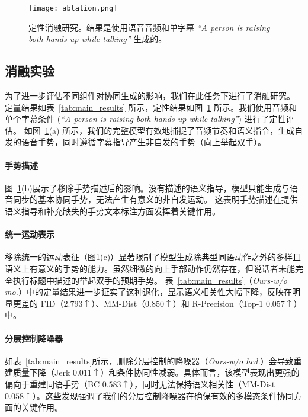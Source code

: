 \begin{figure}[t]
    \centering
    \texttt{[image: ablation.png]}
    \caption{定性消融研究。结果是使用语音音频和单字幕 \textit{``A person is raising both hands up while talking''} 生成的。}
    \label{fig:ablation}
\end{figure}

\subsection{消融实验}
\label{sec:exp_ablation}
为了进一步评估不同组件对协同生成的影响，我们在此任务下进行了消融研究。
定量结果如表~\ref{tab:main_results} 所示，定性结果如图~\ref{fig:ablation} 所示。我们使用音频和单个字幕条件 (\textit{``A person is raising both hands up while talking''}) 进行了定性评估。
如图~\ref{fig:ablation}(a) 所示，我们的完整模型有效地捕捉了音频节奏和语义指令，生成自发的语音手势，同时遵循字幕指导产生非自发的手势（向上举起双手）。

\paragraph{手势描述}
图~\ref{fig:ablation}(b)展示了移除手势描述后的影响。没有描述的语义指导，模型只能生成与语音同步的基本协同手势，无法产生有意义的非自发运动。
这表明手势描述在提供语义指导和补充缺失的手势文本标注方面发挥着关键作用。

\paragraph{统一运动表示}
移除统一的运动表征（图\ref{fig:ablation}(c)）显著限制了模型生成除典型同语动作之外的多样且语义上有意义的手势的能力。虽然细微的向上手部动作仍然存在，但说话者未能完全执行标题中描述的举起双手的预期手势。
表~\ref{tab:main_results}（\textit{Ours-w/o mo.}）中的定量结果进一步证实了这种退化，显示语义相关性大幅下降，反映在明显更差的 FID（$2.793\uparrow$）、MM-Dist（$0.850\uparrow$）和 R-Precision（Top-1 $0.057\uparrow$）中。

\paragraph{分层控制降噪器} %
如表~\ref{tab:main_results}所示，删除分层控制的降噪器（\textit{Ours-w/o hcd.}）会导致重建质量下降（Jerk $0.011\uparrow$）和条件协同性减弱。具体而言，该模型表现出更强的偏向于重建同语手势（BC $0.583\uparrow$），同时无法保持语义相关性（MM-Dist $0.058\uparrow$）。这些发现强调了我们的分层控制降噪器在确保有效的多模态条件协同方面的关键作用。

